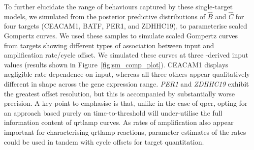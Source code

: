 \documentclass[../thesis.tex]{subfiles}
\begin{document}

To further elucidate the range of behaviours captured by these single-target models, we simulated from the posterior predictive distributions of $\hat{B}$ and $\hat{C}$ for four targets ({CEACAM1}, {BATF}, {PER1}, and {ZDHHC19}), to parameterise scaled Gompertz curves. We used these samples to simulate scaled Gompertz curves from targets showing different types of association between  input and amplification rate/cycle offset. We simulated these curves at three -derived  input values (results shown in Figure~\ref{fig:sm_comp_plot}). CEACAM1 displays negligible rate dependence on  input, whereas all three others appear qualitatively different in shape across the gene expression range. \emph{PER1} and \emph{ZDHHC19} exhibit the greatest offset resolution, but this is accompanied by substantially worse precision. A key point to emphasise is that, unlike in the case of \gls{qpcr}, opting for an approach based purely on time-to-threshold will under-utilise the full information content of \gls{qrtlamp} curves. As rates of amplification also appear important for characterising \gls{qrtlamp} reactions, parameter estimates of the rates could be used in tandem with cycle offsets for target quantitation.
\end{document}
